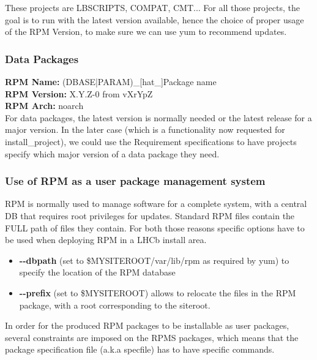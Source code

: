 \documentclass{lhcbnote}
\begin{document}
These projects are LBSCRIPTS, COMPAT, CMT... For all those projects, the goal is to run with the latest version available, hence the choice of proper usage of the RPM Version, to make sure we can use yum to recommend updates.

\subsubsection{Data Packages}
\textbf{RPM Name:} (DBASE|PARAM)\_[hat\_]Package name\\
\textbf{RPM Version:} X.Y.Z-0 from vXrYpZ \\
\textbf{RPM Arch:} noarch \\

For data packages, the latest version is normally needed or the latest release for a major version. In the later case (which is a functionality now requested for install\_project), we could use the Requirement specifications to have projects specify which major version of a data package they need.
  
\subsubsection{Use of RPM as a user package management system}

RPM is normally used to manage software for a complete system, with a central DB that requires root privileges for updates. Standard RPM files contain the FULL path of files they contain. For both those reasons specific options have to be used when deploying RPM in a LHCb install area.  

\begin{itemize}
\item \textbf{\textrm{-}\textrm{-}dbpath} (set to \$MYSITEROOT/var/lib/rpm as required by yum) to specify the location of the RPM database
\item \textbf{\textrm{-}\textrm{-}prefix} (set to \$MYSITEROOT) allows to relocate the files in the RPM package, with a root corresponding to the siteroot.
\end{itemize}

In order for the produced RPM packages to be installable as user packages, several constraints are imposed on the RPMS packages, which means that the package specification file (a.k.a specfile) has to have specific commands.
\end{document}
